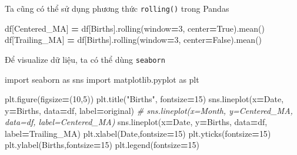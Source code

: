 \documentclass[
]{book}
\newenvironment{Shaded}{\begin{snugshade}}{\end{snugshade}}
\newcommand{\CommentTok}[1]{\textcolor[rgb]{0.56,0.35,0.01}{\textit{#1}}}
\newcommand{\DecValTok}[1]{\textcolor[rgb]{0.00,0.00,0.81}{#1}}
\newcommand{\ImportTok}[1]{#1}
\newcommand{\NormalTok}[1]{#1}
\newcommand{\OperatorTok}[1]{\textcolor[rgb]{0.81,0.36,0.00}{\textbf{#1}}}
\newcommand{\StringTok}[1]{\textcolor[rgb]{0.31,0.60,0.02}{#1}}
\newcommand{\VariableTok}[1]{\textcolor[rgb]{0.00,0.00,0.00}{#1}}
\begin{document}
Ta cũng có thể sử dụng phương thức \texttt{rolling()} trong Pandas

\begin{Shaded}
\begin{Highlighting}[]
\NormalTok{df[}\StringTok{\textquotesingle{}Centered\_MA\textquotesingle{}}\NormalTok{] }\OperatorTok{=}\NormalTok{ df[}\StringTok{\textquotesingle{}Births\textquotesingle{}}\NormalTok{].rolling(window}\OperatorTok{=}\DecValTok{3}\NormalTok{, center}\OperatorTok{=}\VariableTok{True}\NormalTok{).mean()}
\NormalTok{df[}\StringTok{\textquotesingle{}Trailing\_MA\textquotesingle{}}\NormalTok{] }\OperatorTok{=}\NormalTok{ df[}\StringTok{\textquotesingle{}Births\textquotesingle{}}\NormalTok{].rolling(window}\OperatorTok{=}\DecValTok{3}\NormalTok{, center}\OperatorTok{=}\VariableTok{False}\NormalTok{).mean()}
\end{Highlighting}
\end{Shaded}

Để visualize dữ liệu, ta có thể dùng \texttt{seaborn}

\begin{Shaded}
\begin{Highlighting}[]
\ImportTok{import}\NormalTok{ seaborn }\ImportTok{as}\NormalTok{ sns}
\ImportTok{import}\NormalTok{ matplotlib.pyplot }\ImportTok{as}\NormalTok{ plt }

\NormalTok{plt.figure(figsize}\OperatorTok{=}\NormalTok{(}\DecValTok{10}\NormalTok{,}\DecValTok{5}\NormalTok{))}
\NormalTok{plt.title(}\StringTok{"Births"}\NormalTok{, fontsize}\OperatorTok{=}\DecValTok{15}\NormalTok{)}
\NormalTok{sns.lineplot(x}\OperatorTok{=}\StringTok{\textquotesingle{}Date\textquotesingle{}}\NormalTok{, y}\OperatorTok{=}\StringTok{\textquotesingle{}Births\textquotesingle{}}\NormalTok{, data}\OperatorTok{=}\NormalTok{df, label}\OperatorTok{=}\StringTok{\textquotesingle{}original\textquotesingle{}}\NormalTok{)}
\CommentTok{\# sns.lineplot(x=\textquotesingle{}Month\textquotesingle{}, y=\textquotesingle{}Centered\_MA\textquotesingle{}, data=df, label=\textquotesingle{}Centered\_MA\textquotesingle{})}
\NormalTok{sns.lineplot(x}\OperatorTok{=}\StringTok{\textquotesingle{}Date\textquotesingle{}}\NormalTok{, y}\OperatorTok{=}\StringTok{\textquotesingle{}Births\textquotesingle{}}\NormalTok{, data}\OperatorTok{=}\NormalTok{df, label}\OperatorTok{=}\StringTok{\textquotesingle{}Trailing\_MA\textquotesingle{}}\NormalTok{)}
\NormalTok{plt.xlabel(}\StringTok{\textquotesingle{}Date\textquotesingle{}}\NormalTok{,fontsize}\OperatorTok{=}\DecValTok{15}\NormalTok{)}
\NormalTok{plt.yticks(fontsize}\OperatorTok{=}\DecValTok{15}\NormalTok{)}
\NormalTok{plt.ylabel(}\StringTok{\textquotesingle{}Births\textquotesingle{}}\NormalTok{,fontsize}\OperatorTok{=}\DecValTok{15}\NormalTok{)}
\NormalTok{plt.legend(fontsize}\OperatorTok{=}\DecValTok{15}\NormalTok{)}
\end{Highlighting}
\end{Shaded}
\end{document}
